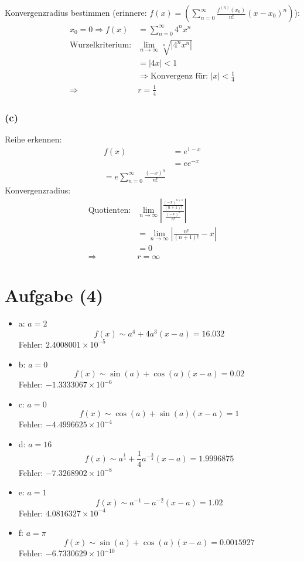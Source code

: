 \documentclass[]{article}
\providecommand{\tightlist}{%
  \setlength{\itemsep}{0pt}\setlength{\parskip}{0pt}}
\begin{document}
Konvergenzradius bestimmen (erinnere:
\(f(x)=\left(\sum_{n=0}^{\infty} \frac{f^{(n)}\left(x_{0}\right)}{n !}\left(x-x_{0}\right)^{n}\right)\)):
\[
\begin{align}
    x_0 = 0
    \Rightarrow f(x) &= \sum_{n=0}^\infty 4^n x^n\\
    \text{Wurzelkriterium:}& \lim_{n\rightarrow \infty} 
    \sqrt[n]{|4^nx^n|}\\
    &= \left| 4x \right| < 1\\
    &\Rightarrow \text{Konvergenz für: } |x| < \frac{1}{4}\\
    \Rightarrow & r=\frac{1}{4}
\end{align}
\]

\hypertarget{c}{%
\subsubsection{(c)}\label{c}}

Reihe erkennen: \[
\begin{align}
    f(x)&=e^{1-x} \\
    &= ee^{-x} \\
    = e \sum_{n=0}^\infty \frac{(-x)^n}{n!}
\end{align}
\] Konvergenzradius: \[
\begin{align}
    \text{Quotienten:}& \lim_{n\rightarrow \infty} 
    \left| \frac{\frac{(-x)^{n+1}}{(n+1)!}}{\frac{(-x)^n}{n!}} \right|\\
    &=  \lim_{n\rightarrow \infty} \left| \frac{n!}{(n+1)!} -x \right|\\
    &= 0\\
    \Rightarrow & r=\infty
\end{align}
\]

\hypertarget{aufgabe-4}{%
\section{Aufgabe (4)}\label{aufgabe-4}}

\begin{itemize}
\tightlist
\item
  a: \(a = 2\)\\
  \[
  f(x) \sim a^4 + 4a^3 (x - a) = 16.032
  \] Fehler: \(\ensuremath{2.4008001\times 10^{-5}}\)
\item
  b: \(a = 0\) \[
  f(x) \sim \sin(a) + \cos(a) (x - a) = 0.02
  \] Fehler: \(\ensuremath{-1.3333067\times 10^{-6}}\)
\item
  c: \(a = 0\) \[
  f(x) \sim \cos(a) + \sin(a) (x - a) = 1
  \] Fehler: \(\ensuremath{-4.4996625\times 10^{-4}}\)
\item
  d: \(a = 16\) \[
  f(x) \sim  a^{\frac{1}{4}} + \frac{1}{4}a^{-\frac{3}{4}} (x - a) = 1.9996875
  \] Fehler: \(\ensuremath{-7.3268902\times 10^{-8}}\)
\item
  e: \(a = 1\) \[
  f(x) \sim a^{-1}  - a^{-2} (x - a) = 1.02
  \] Fehler: \(\ensuremath{4.0816327\times 10^{-4}}\)
\item
  f: \(a = \pi\) \[
  f(x) \sim \sin(a) + \cos(a) (x - a) = 0.0015927
  \] Fehler: \(\ensuremath{-6.7330629\times 10^{-10}}\)
\end{itemize}
\end{document}
